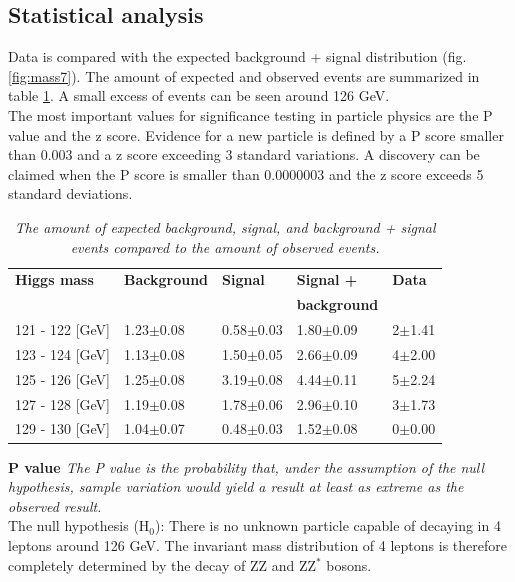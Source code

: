 \documentclass[a4paper,12pt]{article}
\begin{document}
\subsection{Statistical analysis}
Data is compared with the expected background + signal distribution (fig. \ref{fig:mass7}). The amount of expected and observed events are summarized in table \ref{table:expected1}. A small excess of events can be seen around 126 GeV.
\\The most important values for significance testing in particle physics are the P value and the z score. Evidence for a new particle is defined by a P score smaller than 0.003 and a z score exceeding 3 standard variations. A discovery can be claimed when the P score is smaller than 0.0000003 and the z score exceeds 5 standard deviations.
\begin{table}
	\centering
	\begin{tabular}{l|lll|l}
		\textbf{Higgs mass}	& \textbf{Background}	& \textbf{Signal} 		& \textbf{Signal +}		& \textbf{Data}\\
							&						& 						& \textbf{background}	&			   \\
		\hline
		121 - 122 [GeV]		&1.23$\pm$0.08		&0.58$\pm$0.03		&1.80$\pm$0.09		&2$\pm$1.41\\
		123 - 124 [GeV]		&1.13$\pm$0.08		&1.50$\pm$0.05		&2.66$\pm$0.09		&4$\pm$2.00\\
		125 - 126 [GeV]		&1.25$\pm$0.08		&3.19$\pm$0.08		&4.44$\pm$0.11		&5$\pm$2.24\\
		127 - 128 [GeV]		&1.19$\pm$0.08		&1.78$\pm$0.06		&2.96$\pm$0.10		&3$\pm$1.73\\
		129 - 130 [GeV]		&1.04$\pm$0.07		&0.48$\pm$0.03		&1.52$\pm$0.08		&0$\pm$0.00\\
	\end{tabular}
		\caption{\emph{The amount of expected background, signal, and background + signal events compared to the amount of observed events.}}
	\label{table:expected1}
\end{table}
\newline
\newline
\textbf{P value \cite{stat}}
\newline
\emph{The P value is the probability that, under the assumption of the null hypothesis, sample variation would yield a result at least as extreme as the observed result.}
\\The null hypothesis (H$_0$): There is no unknown particle capable of decaying in 4 leptons around 126 GeV. The invariant mass distribution of 4 leptons is therefore completely determined by the decay of ZZ and ZZ$^*$ bosons.
\end{document}
